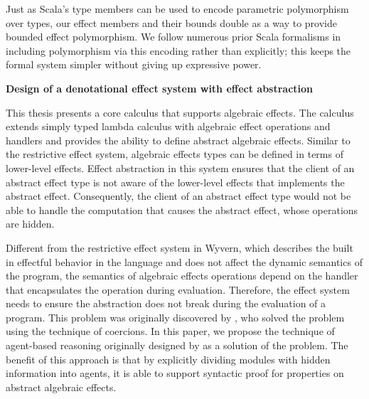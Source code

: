  Just as Scala's type members can be used to encode parametric polymorphism over types, our effect members and their bounds double as a way to provide bounded effect polymorphism. We follow numerous prior Scala formalisms in including polymorphism via this encoding rather than explicitly; this keeps the formal system simpler without giving up expressive power. 


\noindent\textbf{Design of a denotational effect system with effect abstraction}  

This thesis presents a core calculus that supports algebraic effects. The calculus extends simply typed lambda calculus with algebraic effect operations and handlers and provides the ability to define abstract algebraic effects. Similar to the restrictive effect system, algebraic effects types can be defined in terms of lower-level effects. Effect abstraction in this system ensures that the client of an abstract effect type is not aware of the lower-level effects that implements the abstract effect. Consequently, the client of an abstract effect type would not be able to handle the computation that causes the abstract effect, whose operations are hidden.

Different from the restrictive effect system in Wyvern, which describes the built in effectful behavior in the language and does not affect the dynamic semantics of the program, the semantics of algebraic effects operations depend on the handler that encapsulates the operation during evaluation.  Therefore, the effect system needs to ensure the abstraction does not break during the evaluation of a program. This problem was originally discovered by \citet{biernacki19}, who solved the problem using the technique of coercions. In this paper, we propose the technique of agent-based reasoning originally designed by \citet{grossman00} as a solution of the problem. The benefit of this approach is that by explicitly dividing modules with hidden information into agents, it is able to support syntactic proof for properties on abstract algebraic effects.

